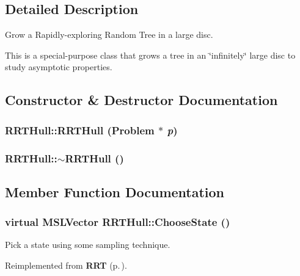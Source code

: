 \subsection{Detailed Description}
Grow a Rapidly-exploring Random Tree in a large disc.

This is a special-purpose class that grows a tree in an \char`\"{}infinitely\char`\"{} large disc to study asymptotic properties. 



\subsection{Constructor \& Destructor Documentation}
\subsubsection{\setlength{\rightskip}{0pt plus 5cm}RRTHull::RRTHull ({\bf Problem} $\ast$ {\em p})}\label{class_RRTHull_a0}


\subsubsection{\setlength{\rightskip}{0pt plus 5cm}RRTHull::$\sim$RRTHull ()\hspace{0.3cm}{\tt  [inline, virtual]}}\label{class_RRTHull_a1}




\subsection{Member Function Documentation}
\subsubsection{\setlength{\rightskip}{0pt plus 5cm}virtual {\bf MSLVector} RRTHull::Choose\-State ()\hspace{0.3cm}{\tt  [protected, virtual]}}\label{class_RRTHull_b0}


Pick a state using some sampling technique.



Reimplemented from {\bf RRT} {\rm (p.\,\pageref{class_RRT_b4})}.


